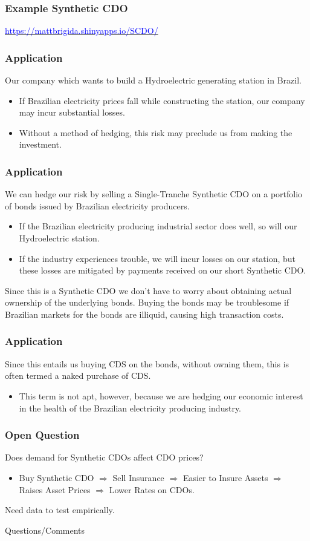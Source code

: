 \documentclass[xcolor=dvipsnames]{beamer}
\begin{document}
\begin{frame}
  \frametitle{Example Synthetic CDO}

\href{https://mattbrigida.shinyapps.io/SCDO/}{\textcolor{blue}{https://mattbrigida.shinyapps.io/SCDO/}}

\end{frame}
%
\begin{frame}
  \frametitle{Application}
Our company which wants to build a Hydroelectric generating station in Brazil.
\begin{itemize}
\item If Brazilian electricity prices fall while constructing the station, our company may incur substantial losses.
\item Without a method of hedging, this risk may preclude us from making the investment.
\end{itemize}
\end{frame}
%
\begin{frame}
  \frametitle{Application}
We can hedge our risk by selling a Single-Tranche Synthetic CDO on a portfolio of bonds issued by Brazilian electricity producers.
\begin{itemize}
\item If the Brazilian electricity producing industrial sector does well, so will our Hydroelectric station.
\item If the industry experiences trouble, we will incur losses on our station, but these losses are mitigated by payments received on our short Synthetic CDO.
\end{itemize}
Since this is a Synthetic CDO we don't have to worry about obtaining actual ownership of the underlying bonds. Buying the bonds may be troublesome if Brazilian markets for the bonds are illiquid, causing high transaction costs.
\end{frame}
%
\begin{frame}
  \frametitle{Application}
Since this entails us buying CDS on the bonds, without owning them, this is often termed a naked purchase of CDS. 
\begin{itemize}
\item This term is not apt, however, because we are hedging our economic interest in the health of the Brazilian electricity producing industry.
\end{itemize}
\end{frame}
%
\begin{frame}
  \frametitle{Open Question}
Does demand for Synthetic CDOs affect CDO prices?
\begin{itemize}
\item Buy Synthetic CDO $\Rightarrow$ Sell Insurance  $\Rightarrow$ Easier to Insure Assets  $\Rightarrow$ Raises Asset Prices  $\Rightarrow$ Lower Rates on CDOs.  
\end{itemize}
\vspace*{1cm}
Need data to test empirically.
\end{frame}

%
\begin{frame}
\begin{center}
Questions/Comments
\end{center}
\end{frame}
\end{document}
